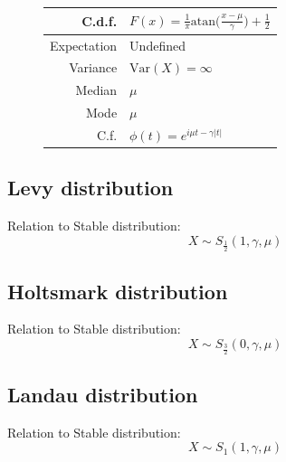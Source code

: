 \documentclass[a4paper,11pt]{article}
\theoremstyle{plain}
\theoremstyle{definition}
\newcommand{\Var}{\mathrm{Var}}
\begin{document}
\begin{figure}[!htb]
\begin{minipage}{0.4\textwidth}
\begin{tabular}{| r | l |}
			\hline
			C.d.f. & $F(x)= \frac{1}{\pi} \mathrm{atan}\Big( \frac{x-\mu}{\gamma} \Big) + \frac{1}{2} $ \\
			\hline
			Expectation & Undefined \\
			\hline
			Variance & $\Var(X) = \infty $\\
			\hline
			Median & $\mu$ \\
			\hline
			Mode & $\mu$ \\
			\hline
			C.f. & $\phi(t) = e^{i\mu t - \gamma |t|}  $ \\
			\hline
		\end{tabular}
	    \end{minipage}
	\end{figure}
	
	
\subsection{Levy distribution}
	Relation to Stable distribution:
	\[X \sim S_{\frac{1}{2}}(1, \gamma, \mu) \]


\subsection{Holtsmark distribution}
	Relation to Stable distribution:
	\[X \sim S_{\frac{3}{2}}(0, \gamma, \mu) \]


\subsection{Landau distribution}
	Relation to Stable distribution:
	\[X \sim S_{1}(1, \gamma, \mu) \]
	
	
\end{document}
